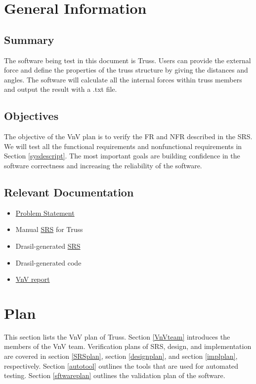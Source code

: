 \documentclass[12pt, titlepage]{article}
\begin{document}
\section{General Information} \label{Geninf}

\subsection{Summary}

The software being test in this document is Truss. Users can provide the 
external force and define the properties of the truss structure by giving the 
distances and angles. The software will calculate all the internal forces 
within truss members and output the result with a .txt file. 


\subsection{Objectives}
The objective of the VnV plan is to verify the FR and NFR described in the SRS. 
We will test all the functional requirements and nonfunctional requirements in 
Section \ref{sysdescript}. The most important goals are building confidence 
in the software correctness and increasing the reliability of the software. 

\subsection{Relevant Documentation}

\begin{itemize}
	\item 
	\href{https://github.com/tingyuw/cas741/blob/master/docs/ProblemStatement/ProblemStatement.pdf}{Problem
	 Statement}
	\item Manual
	\href{https://github.com/tingyuw/cas741/blob/master/docs/SRS/SRS.pdf}{SRS} 
	for Truss
	\item Drasil-generated 
	\href{https://github.com/tingyuw/cas741/tree/master/docs/Drasil}{SRS}
	\item Drasil-generated code
	\item 
	\href{https://github.com/tingyuw/cas741/blob/master/docs/VnVReport/VnVReport.pdf}{VnV
	 report}
\end{itemize}


\section{Plan} \label{verplan}
This section lists the VnV plan of Truss. Section \ref{VnVteam} introduces the 
members of the VnV team. Verification plans of SRS, design, and implementation 
are covered in section \ref{SRSplan}, section \ref{designplan}, and section 
\ref{implplan}, respectively. Section \ref{autotool} outlines the tools that 
are used for automated testing. Section \ref{sftwareplan} outlines the 
validation plan of the software.
\end{document}
